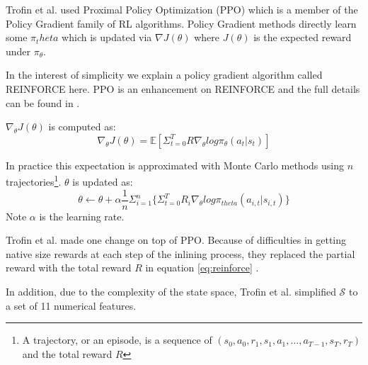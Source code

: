 \documentclass[nohyperref]{article}
\theoremstyle{plain}
\theoremstyle{definition}
\theoremstyle{remark}
\begin{document}
Trofin et al. used Proximal Policy Optimization (PPO) \cite{ppo} which is a member of the Policy Gradient \cite{pg_algo} family of RL algorithms. Policy Gradient methods directly learn some $\pi_theta$ which is updated via $\nabla J(\theta)$ where $J(\theta)$ is the expected reward under $\pi_{\theta}$.

In the interest of simplicity we explain a policy gradient algorithm called REINFORCE \cite{REINFORCE} here. PPO is an enhancement on REINFORCE and the full details can be found in \cite{ppo}.

$\nabla_{\theta}J(\theta)$ is computed as:
\begin{equation} \label{eq:reinforce}
    \nabla_{\theta}J(\theta) = \mathbb{E}\left[\Sigma^{T}_{t=0}R\nabla_{\theta}log\pi_{\theta}(a_t|s_t)\right]
\end{equation}

In practice this expectation is approximated with Monte Carlo methods using $n$ trajectories\footnote{A trajectory, or an episode, is a sequence of $(s_0, a_0, r_1, s_1, a_1, ..., a_{T-1}, s_T, r_T)$ and the total reward $R$}. $\theta$ is updated as:
\begin{equation}
    \theta \leftarrow \theta + \alpha\frac{1}{n}\Sigma^{n}_{i=1}\bigl\{\Sigma^{T}_{t=0}R_{i}\nabla_{\theta}log\pi_{theta}(a_{i,t}|s_{i,t})\bigr\}
\end{equation}
Note $\alpha$ is the learning rate.

Trofin et al. made one change on top of PPO. Because of difficulties in getting native size rewards at each step of the inlining process, they replaced the partial reward with the total reward $R$ in equation \ref{eq:reinforce} \cite{mlgo}.

In addition, due to the complexity of the state space, Trofin et al. simplified $\mathcal{S}$ to a set of 11 numerical features.



\end{document}
